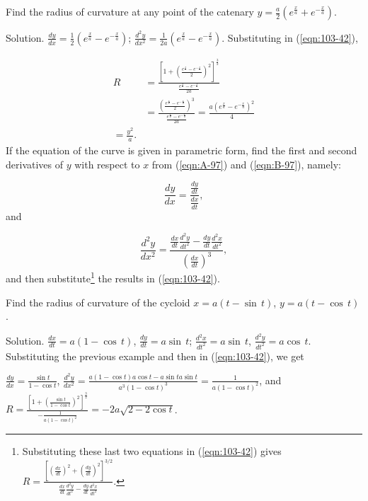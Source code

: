 \begin{example}
{\rm
Find the radius of curvature at any point of the catenary 
$y = \frac{a}{2} (e^{\frac{x}{a}} + e^{-\frac{x}{a}})$.

Solution. 	
$\frac{dy}{dx} 	
= \frac{1}{2} (e^{\frac{x}{a}} - e^{-\frac{x}{a}})$; 
$\frac{d^2 y}{dx^2} = \frac{1}{2a} (e^{\frac{x}{a}} - e^{-\frac{x}{a}})$.
Substituting in (\ref{eqn:103-42}),

\[
\begin{array}{ll}
R 
&= \frac{\left[ 1 + \left( \frac{e^{\frac{x}{a}} 
- e^{-\frac{x}{a}}}{2} \right)^2 \right]^{\frac{3}{2}} }{\frac{ 
e^{\frac{x}{a}} - e^{-\frac{x}{a}} }{2a}} \\
&= \frac{\left( \frac{ e^{\frac{x}{a}} 
- e^{-\frac{x}{a}} }{2} \right)^3}{ \frac{ e^{\frac{x}{a}} 
- e^{-\frac{x}{a}} }{2a}} = \frac{a (e^{\frac{x}{a}} - e^{-\frac{x}{a}})^2}{4} \\
= \frac{y^2}{a}.
\end{array}
\]
If the equation of the curve is given in parametric form, 
find the first and second derivatives of $y$ with respect to 
$x$ from (\ref{eqn:A-97}) and (\ref{eqn:B-97}), %
namely:

\[
\frac{dy}{dx} 	= \frac{ \frac{dy}{dt} }{ \frac{dx}{dt} }, 
\]
and

\[
\frac{d^2 y}{dx^2} 	
= \frac{ \frac{dx}{dt} \frac{d^2 y}{dt^2} 
- \frac{dy}{dt} \frac{d^2 x}{dt^2} }{ \left( \frac{dx}{dt} \right)^3 },
\]
and then substitute\footnote{Substituting 
these last two equations %
in (\ref{eqn:103-42}) gives 
$R = \frac{ \left[ \left( \frac{dx}{dt} \right)^2 
+ \left( \frac{dy}{dt} \right)^2 \right]^{3/2} }{ 
\frac{dx}{dt} \frac{d^2 y}{dt^2} 
- \frac{dy}{dt} \frac{d^2 x}{dt^2}}$.} 
the results in (\ref{eqn:103-42}).
}
\end{example}

\begin{example}
\label{ex:103-2}
{\rm
Find the radius of curvature of the cycloid
  	$x = a(t -\sin\, t)$, $y = a(t -\cos\, t)$.

Solution. 
$\frac{dx}{dt} = a(1 - \cos\, t)$, 
$\frac{dy}{dt} = a \sin\, t$;
$\frac{d^2 x}{dt^2} = a \sin\, t$,
$\frac{d^2 y}{dt^2} = a \cos\, t$.
Substituting the previous example %
and then in (\ref{eqn:103-42}), %
we get

$\frac{dy}{dx} = \frac{\sin t}{1 - \cos t}$, 
$\frac{d^2 y}{dx^2} 
= \frac{ a(1 - \cos t) a \cos t - a \sin t a \sin t }{ a^3 (1 - \cos t)^3 } 
= \frac{1}{a(1 - \cos t)^2}$, and
$R = \frac{ \left[ 1 + \left( \frac{\sin t}{1 
- \cos t} \right)^2 \right]^{\frac{3}{2}} }{ -\frac{1}{a(1 
- \cos t)^2} } = -2a \sqrt{2 - 2 \cos t}$. 
}
\end{example}

